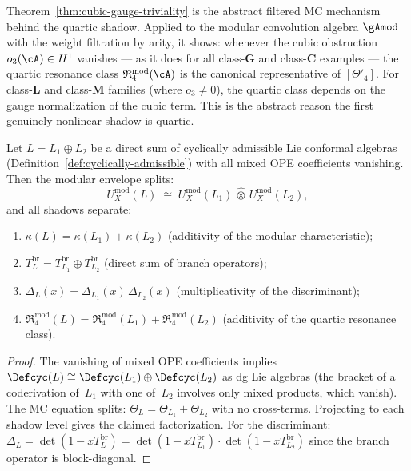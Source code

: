 \begin{remark}
\label{rem:quartic-canonical-class}
Theorem~\ref{thm:cubic-gauge-triviality} is the abstract
filtered MC mechanism behind the quartic shadow.  Applied to
the modular convolution algebra $\gAmod$ with the weight
filtration by arity, it shows: whenever the cubic obstruction
$o_3(\cA) \in H^1$ vanishes --- as it does for all
class-$\mathbf{G}$ and class-$\mathbf{C}$ examples --- the
quartic resonance class
$\mathfrak{R}_4^{\mathrm{mod}}(\cA)$ is the canonical
representative of $[\Theta'_4]$.  For class-$\mathbf{L}$ and
class-$\mathbf{M}$ families (where $o_3 \neq 0$), the quartic
class depends on the gauge normalization of the cubic term.
This is the abstract reason the first genuinely nonlinear
shadow is quartic.
\end{remark}

\begin{proposition}
\label{prop:independent-sum-factorization}
\ClaimStatusProvedHere
{}
Let $L = L_1 \oplus L_2$ be a direct sum of cyclically
admissible Lie conformal algebras
(Definition~\textup{\ref{def:cyclically-admissible}})
with all mixed OPE coefficients vanishing.  Then
the modular envelope splits:
\[
U_X^{\mathrm{mod}}(L)
\;\cong\;
U_X^{\mathrm{mod}}(L_1)
\,\widehat\otimes\,
U_X^{\mathrm{mod}}(L_2),
\]
and all shadows separate:
\begin{enumerate}[label=\textup{(\roman*)}]
\item $\kappa(L) = \kappa(L_1) + \kappa(L_2)$
  \textup{(}additivity of the modular
  characteristic\textup{)};
\item $T_L^{\mathrm{br}}
  = T_{L_1}^{\mathrm{br}}
  \oplus T_{L_2}^{\mathrm{br}}$
  \textup{(}direct sum of branch operators\textup{)};
\item $\Delta_L(x)
  = \Delta_{L_1}(x)\,\Delta_{L_2}(x)$
  \textup{(}multiplicativity of the
  discriminant\textup{)};
\item $\mathfrak{R}_4^{\mathrm{mod}}(L)
  = \mathfrak{R}_4^{\mathrm{mod}}(L_1)
  + \mathfrak{R}_4^{\mathrm{mod}}(L_2)$
  \textup{(}additivity of the quartic resonance
  class\textup{)}.
\end{enumerate}
\end{proposition}

\begin{proof}
The vanishing of mixed OPE coefficients implies
$\Defcyc(L)
\cong \Defcyc(L_1) \oplus \Defcyc(L_2)$
as dg Lie algebras (the bracket of a coderivation
of~$L_1$ with one of~$L_2$ involves only mixed products,
which vanish).  The MC equation splits:
$\Theta_L = \Theta_{L_1} + \Theta_{L_2}$ with no
cross-terms.
Projecting to each shadow level gives the claimed
factorization.
For the discriminant:
$\Delta_L = \det(1 - xT_L^{\mathrm{br}})
= \det(1 - xT_{L_1}^{\mathrm{br}}) \cdot
\det(1 - xT_{L_2}^{\mathrm{br}})$
since the branch operator is block-diagonal.
\end{proof}

